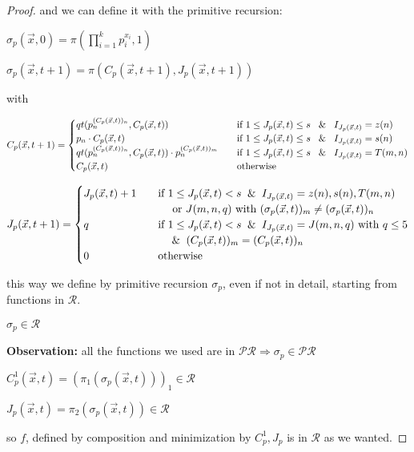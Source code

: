\begin{theorem}[$\mathcal{R} = \mathcal{C}$]
\begin{proof}
    and we can define it with the primitive recursion:

    $\sigma_p(\vec{x}, 0) = \pi(\prod\limits_{i=1}^k p_i^{x_i}, 1)$

    $\sigma_p(\vec{x}, t+1) = \pi(C_p(\vec{x},t+1), J_p(\vec{x},t+1))$

    with

    \[
      C_p(\vec{x},t+1) = \begin{cases}
        qt(p_n^{(C_p(\vec{x},t))_n}, C_p(\vec{x},t)) & \quad \text{if }1 \leq J_p(\vec{x},t) \leq s \; \And \; I_{J_p(\vec{x},t)} = z(n) \\
        p_n \cdot C_p(\vec{x},t) & \quad \text{if }1 \leq J_p(\vec{x},t) \leq s \; \And \; I_{J_p(\vec{x},t)} = s(n) \\
        qt(p_n^{(C_p(\vec{x},t))_n}, C_p(\vec{x},t)) \cdot p_n^{(C_p(\vec{x},t))_m} & \quad \text{if }1 \leq J_p(\vec{x},t) \leq s \; \And \; I_{J_p(\vec{x},t)} = T(m,n) \\
        C_p(\vec{x}, t) & \quad \text{otherwise}
      \end{cases}
    \]

    \[
      J_p(\vec{x}, t+1) = \begin{cases}
        J_p(\vec{x}, t) + 1 & \quad \text{if } 1 \leq J_p(\vec{x}, t) < s \And I_{J_p(\vec{x}, t)} = z(n), s(n), T(m,n) \\
        & \quad \quad \text{ or } J(m,n,q) \text{ with } (\sigma_p(\vec{x}, t))_m \neq (\sigma_p(\vec{x}, t))_n \\
        q & \quad \text{if } 1 \leq J_p(\vec{x}, t) < s \And I_{J_p(\vec{x}, t)} = J(m,n,q) \text{ with } q\leq 5 \\
        & \quad \quad \And (C_p(\vec{x}, t))_m = (C_p(\vec{x}, t))_n \\
        0 & \quad \text{otherwise}
      \end{cases}
    \]

    this way we define by primitive recursion $\sigma_p$, even if not in
    detail, starting from functions in $\mathcal{R}$.

    $\sigma_p \in \mathcal{R}$

    \textbf{Observation:} all the functions we used are in  $\mathcal{PR} \Rightarrow \sigma_p \in \mathcal{PR}$

    $C_p^1(\vec{x}, t) = (\pi_1(\sigma_p(\vec{x}, t)))_1 \in \mathcal{R}$

    $J_p(\vec{x}, t) = \pi_2(\sigma_p(\vec{x}, t)) \in \mathcal{R}$

    so $f$, defined by composition and minimization by $C_p^1, J_p$ is in $\mathcal{R}$ as we wanted.

  \end{proof}
\end{theorem}
